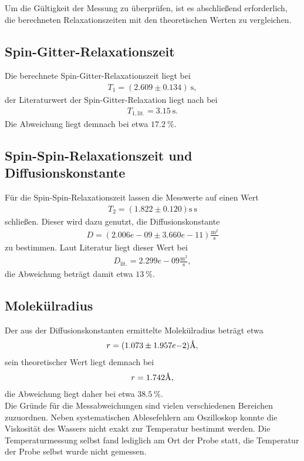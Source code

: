 \noindent Um die Gültigkeit der Messung zu überprüfen, ist es abschließend
erforderlich, die berechneten Relaxationszeiten mit den theoretischen Werten
zu vergleichen.
\subsection{Spin-Gitter-Relaxationszeit}
Die berechnete Spin-Gitter-Relaxationszeit liegt bei
\begin{align*}
  T_1 =  (2.609  \pm  0.134) \: \si{\second},
\end{align*}
\noindent der Literaturwert der Spin-Gitter-Relaxation liegt nach
\cite{temperatur_t1} bei
\begin{align*}
  T_{1,\text{lit.}} = 3.15 \: \si{\second}.
\end{align*}
\noindent Die Abweichung liegt demnach bei etwa $\SI{17.2}{\percent}$.
\subsection{Spin-Spin-Relaxationszeit und Diffusionskonstante}
\noindent Für die Spin-Spin-Relaxationszeit lassen die Messwerte auf einen Wert
\begin{align*}
  T_2 =  (1.822  \pm  0.120) \si{\second} \: \si{\second}
\end{align*}
\noindent schließen. Dieser wird dazu genutzt, die Diffusionskonstante
\begin{align*}
  D =  (2.006e-09 \pm 3.660e-11) \frac{\si{\meter^2}}{\si{\second}}
\end{align*}
\noindent zu bestimmen. Laut Literatur \cite{diffusion} liegt dieser Wert bei
\begin{align*}
  D_\text{lit.} =  2.299e-09  \frac{\si{\meter^2}}{\si{\second}},
\end{align*}
\noindent die Abweichung beträgt damit etwa $\SI{13}{\percent}$.
\subsection{Molekülradius}
Der aus der Diffusionskonstanten ermittelte Molekülradius beträgt etwa
\begin{align*}
 r = (1.073\pm 1.957e{-2}) \text{\r{A}},
\end{align*}
\noindent sein theoretischer Wert liegt demnach bei
\begin{align*}
 r = 1.742 \text{\r{A}},
\end{align*}
\noindent die Abweichung liegt daher bei etwa $\SI{38.5}{\percent}$. \\
\noindent Die Gründe für die Messabweichungen sind vielen verschiedenen
Bereichen zuzuordnen. Neben systematischen Ablesefehlern am Oszilloskop konnte
die Viskosität des Wassers nicht exakt zur Temperatur bestimmt werden. Die
Temperaturmessung selbst fand lediglich am Ort der Probe statt, die Temperatur
der Probe selbst wurde nicht gemessen.
